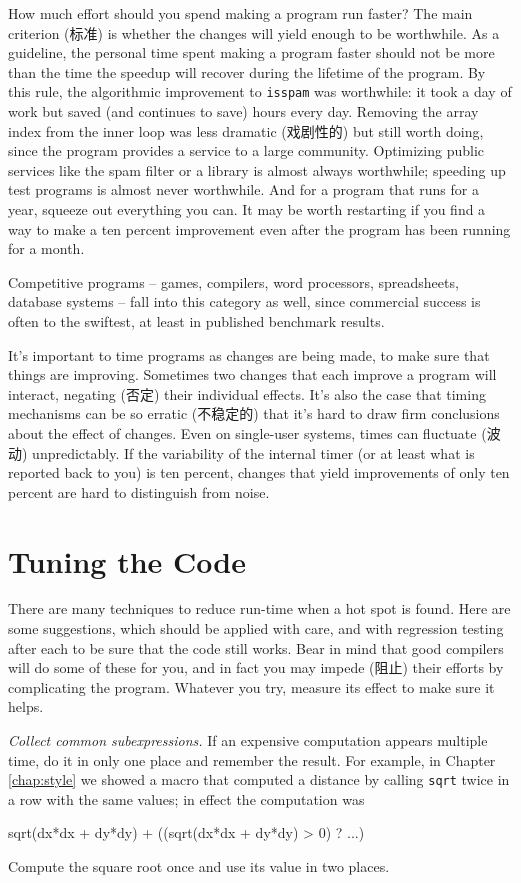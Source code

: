 How much effort should you spend making a program run faster? The main
criterion (标准) is whether the changes will yield enough to be worthwhile.
As a guideline, the personal time spent making a program faster should not
be more than the time the speedup will recover during the lifetime of the
program. By this rule, the algorithmic improvement to \verb'isspam' was
worthwhile: it took a day of work but saved (and continues to save) hours
every day. Removing the array index from the inner loop was less dramatic
(戏剧性的) but still worth doing, since the program provides a service to a
large community. Optimizing public services like the spam filter or a
library is almost always worthwhile; speeding up test programs is almost
never worthwhile. And for a program that runs for a year, squeeze out
everything you can. It may be worth restarting if you find a way to make a
ten percent improvement even after the program has been running for a
month.

Competitive programs -- games, compilers, word processors, spreadsheets,
database systems -- fall into this category as well, since commercial
success is often to the swiftest, at least in published benchmark results.

It's important to time programs as changes are being made, to make sure
that things are improving. Sometimes two changes that each improve a
program will interact, negating (否定) their individual effects. It's also
the case that timing mechanisms can be so erratic (不稳定的) that it's hard
to draw firm conclusions about the effect of changes.  Even on single-user
systems,  times can fluctuate (波动) unpredictably. If the variability of
the internal timer (or at least what is reported back to you) is ten
percent, changes that yield improvements of only ten percent are hard to
distinguish from noise.

\section{Tuning the Code}

There are many techniques to reduce run-time when a hot spot is found. Here
are some suggestions, which should be applied with care, and with
regression testing after each to be sure that the code still works. Bear in
mind that good compilers will do some of these for you, and in fact you may
impede (阻止) their efforts by complicating the program. Whatever you try,
measure its effect to make sure it helps.

\emph{Collect common subexpressions.} If an expensive computation appears
multiple time, do it in only one place and remember the result. For
example, in Chapter \ref{chap:style} we showed a macro that computed a
distance by calling \verb'sqrt' twice in a row with the same values; in
effect the computation was
\begin{badcode}
    sqrt(dx*dx + dy*dy) + ((sqrt(dx*dx + dy*dy) > 0) ? ...)
\end{badcode}
Compute the square root once and use its value in two places.

